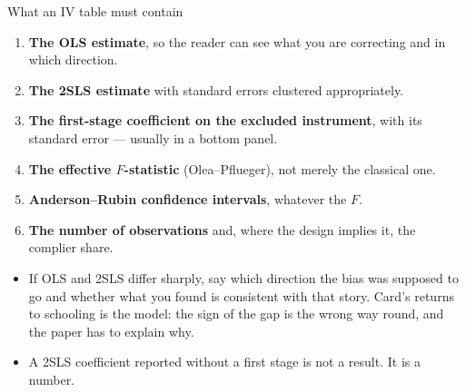 \documentclass[
  11pt,
  ignorenonframetext,
  aspectratio=169,
]{beamer}
\providecommand{\tightlist}{%
  \setlength{\itemsep}{0pt}\setlength{\parskip}{0pt}}
\begin{document}
\begin{frame}{What an IV table must contain}
\protect{}\label{what-an-iv-table-must-contain}
\begin{enumerate}
\tightlist
\item
  \textbf{The OLS estimate}, so the reader can see what you are
  correcting and in which direction.
\item
  \textbf{The 2SLS estimate} with standard errors clustered
  appropriately.
\item
  \textbf{The first-stage coefficient on the excluded instrument}, with
  its standard error --- usually in a bottom panel.
\item
  \textbf{The effective \(F\)-statistic} (Olea--Pflueger), not merely
  the classical one.
\item
  \textbf{Anderson--Rubin confidence intervals}, whatever the \(F\).
\item
  \textbf{The number of observations} and, where the design implies it,
  the complier share.
\end{enumerate}

\vspace{0.4em}

\begin{itemize}
\tightlist
\item
  If OLS and 2SLS differ sharply, say which direction the bias was
  supposed to go and whether what you found is consistent with that
  story. Card's returns to schooling is the model: the sign of the gap
  is the wrong way round, and the paper has to explain why.
\item
  A 2SLS coefficient reported without a first stage is not a result. It
  is a number.
\end{itemize}
\end{frame}
\end{document}
